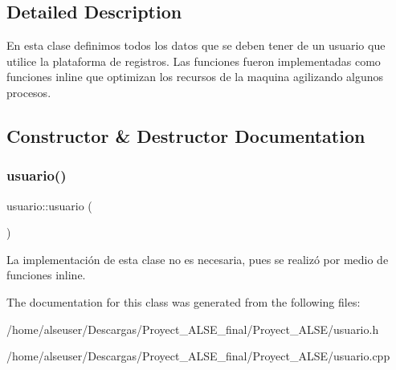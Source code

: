 \subsection{Detailed Description}
En esta clase definimos todos los datos que se deben tener de un usuario que utilice la plataforma de registros. Las funciones fueron implementadas como funciones inline que optimizan los recursos de la maquina agilizando algunos procesos. 

\subsection{Constructor \& Destructor Documentation}
\mbox{\label{classusuario_a31d080a47bebcedffe122527e3389648}} 
\subsubsection{\texorpdfstring{usuario()}{usuario()}}
{\footnotesize\ttfamily usuario\+::usuario (\begin{DoxyParamCaption}{ }\end{DoxyParamCaption})}

La implementación de esta clase no es necesaria, pues se realizó por medio de funciones inline. 

The documentation for this class was generated from the following files\+:\begin{DoxyCompactItemize}
\item 
/home/alseuser/\+Descargas/\+Proyect\+\_\+\+A\+L\+S\+E\+\_\+final/\+Proyect\+\_\+\+A\+L\+S\+E/usuario.\+h\item 
/home/alseuser/\+Descargas/\+Proyect\+\_\+\+A\+L\+S\+E\+\_\+final/\+Proyect\+\_\+\+A\+L\+S\+E/usuario.\+cpp\end{DoxyCompactItemize}
